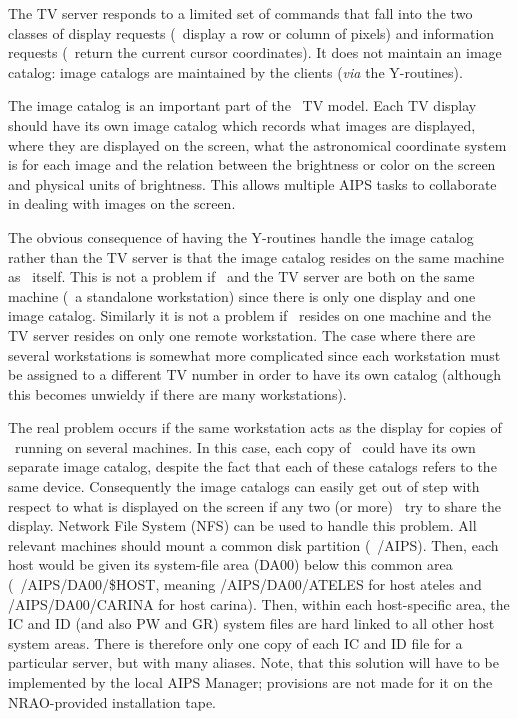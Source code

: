 The TV server responds to a limited set of commands that fall into
the two classes of display requests (\eg\ display a row or column of
pixels) and information requests (\eg\ return the current cursor
coordinates).  It does not maintain an image catalog: image
catalogs are maintained by the clients ({\it via} the Y-routines).


The image catalog is an important part of the \AIPS\ TV model.
Each TV display should have its own image catalog which records what
images are displayed, where they are displayed on the screen, what the
astronomical coordinate system is for each image and the relation
between the brightness or color on the screen and physical units of
brightness.  This allows multiple AIPS tasks to collaborate in dealing
with images on the screen.

The obvious consequence of having the Y-routines handle the image
catalog rather than the TV server is that the image catalog
resides on the same machine as \AIPS\ itself.  This is not a problem
if \AIPS\ and the TV server are both on the same machine (\eg\ a
standalone workstation) since there is only one display and one image
catalog.  Similarly it is not a problem if \AIPS\ resides on one
machine and the TV server resides on only one remote workstation.  The
case where there are several workstations is somewhat more complicated
since each workstation must be assigned to a different TV number in
order to have its own catalog (although this becomes unwieldy if
there are many workstations).

The real problem occurs if the same workstation acts as the display
for copies of \AIPS\ running on several machines. In this case, each
copy of \AIPS\ could have its own separate image catalog, despite
the fact that each of these catalogs refers to the same device.
Consequently the image catalogs can easily get out of step with
respect to what is displayed on the screen if any two (or more)
\AIPS\ try to share the display.  Network File System (NFS) can be
used to handle this problem.  All relevant machines should mount a
common disk partition (\eg\ /AIPS).  Then, each host would be given
its system-file area (DA00) below this common area
(\eg\ /AIPS/DA00/\$HOST, meaning /AIPS/DA00/ATELES for host ateles
and /AIPS/DA00/CARINA for host carina).  Then, within each
host-specific area, the IC and ID (and also PW and GR) system files
are hard linked to all other host system areas.  There is therefore
only one copy of each IC and ID file for a particular server, but with
many aliases.  Note, that this solution will have to be implemented by
the local AIPS Manager; provisions are not made for it on the
NRAO-provided installation tape.

